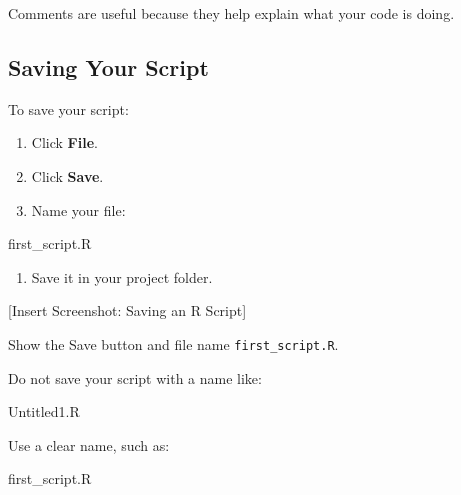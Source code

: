 \documentclass[
  letterpaper,
  DIV=11,
  numbers=noendperiod]{scrartcl}
\newenvironment{Shaded}{\begin{snugshade}}{\end{snugshade}}
\newcommand{\NormalTok}[1]{\textcolor[rgb]{0.00,0.23,0.31}{#1}}
\providecommand{\tightlist}{%
  \setlength{\itemsep}{0pt}\setlength{\parskip}{0pt}}
\begin{document}
Comments are useful because they help explain what your code is doing.

\subsection{Saving Your Script}\label{saving-your-script}

To save your script:

\begin{enumerate}
\def\labelenumi{\arabic{enumi}.}
\tightlist
\item
  Click \textbf{File}.
\item
  Click \textbf{Save}.
\item
  Name your file:
\end{enumerate}

\begin{Shaded}
\begin{Highlighting}[]
\NormalTok{first\_script.R}
\end{Highlighting}
\end{Shaded}

\begin{enumerate}
\def\labelenumi{\arabic{enumi}.}
\setcounter{enumi}{3}
\tightlist
\item
  Save it in your project folder.
\end{enumerate}

{[}Insert Screenshot: Saving an R Script{]}

Show the Save button and file name \texttt{first\_script.R}.

\begin{tcolorbox}[enhanced jigsaw, arc=.35mm, bottomrule=.15mm, bottomtitle=1mm, breakable, colback=white, colbacktitle=quarto-callout-warning-color!10!white, colframe=quarto-callout-warning-color-frame, coltitle=black, left=2mm, leftrule=.75mm, opacityback=0, opacitybacktitle=0.6, rightrule=.15mm, title=\textcolor{quarto-callout-warning-color}{\faExclamationTriangle}\hspace{0.5em}{Common Mistake}, titlerule=0mm, toprule=.15mm, toptitle=1mm]

Do not save your script with a name like:

\begin{Shaded}
\begin{Highlighting}[]
\NormalTok{Untitled1.R}
\end{Highlighting}
\end{Shaded}

Use a clear name, such as:

\begin{Shaded}
\begin{Highlighting}[]
\NormalTok{first\_script.R}
\end{Highlighting}
\end{Shaded}

\end{tcolorbox}
\end{document}
